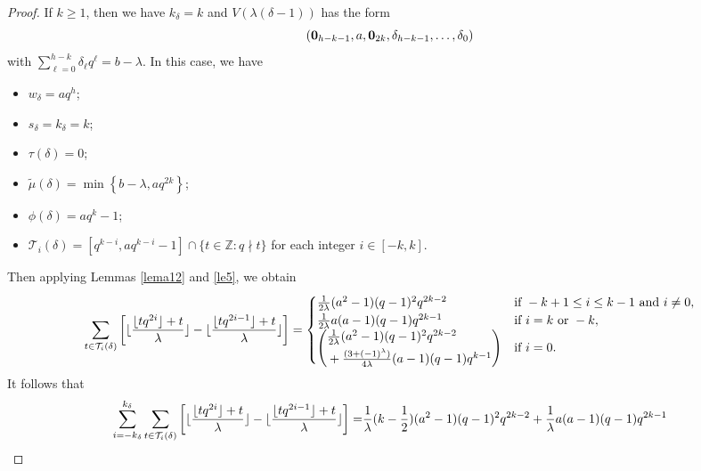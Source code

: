 \documentclass[journal,onecolumn]{IEEEtran}
\begin{document}
\begin{proof}
If $k\geq 1$, then we have  $k_{\delta}=k$ and $V(\lambda(\delta -1))$ has the form 
\begin{equation}\notag
    (\mathbf{0}_{h-k-1}, a, \mathbf{0}_{2k}, \delta_{h-k-1}, \ldots,\delta_0)
\end{equation}with $\sum\limits_{\ell=0}^{h-k}\delta_{\ell}q^{\ell}=b-\lambda$.
In this case, we have 
\begin{itemize}
\item $w_{\delta}=aq^h$;
    \item $s_{\delta}=k_{\delta}=k$;
    \item $\tau(\delta)=0$;
    \item $\widetilde{\mu}(\delta)=\min\left\{b-\lambda, a q^{2k}\right\}$;
    \item $\phi(\delta)=aq^k-1$;
   \item $\mathcal{T}_i(\delta)=\left[q^{k-i},a q^{k-i}-1\right]\cap \{t\in \mathbb{Z}: q\nmid t\}$ for each integer $i\in [-k,k]$.
\end{itemize}
Then applying Lemmas \ref{lema12} and \ref{le5}, we obtain 
\begin{equation}\notag
    \sum\limits_{t\in \mathcal{T}_i(\delta)} \left[ \lfloor\frac{\lfloor tq^{2i}\rfloor+t}{\lambda}\rfloor -  \lfloor\frac{\lfloor tq^{2i-1}\rfloor+t}{\lambda}\rfloor\right]= 
    \begin{cases}
         \frac{1}{2\lambda}(a^2-1)(q-1)^2q^{2k-2}  &\hbox{if } -k+1\leq i \leq  k-1 \hbox{ and } i\neq 0,\\
         \frac{1}{2\lambda}a(a-1)(q-1)q^{2k-1} &\hbox{if } i=k \hbox{ or } -k,\\
         {\left(\begin{aligned}
             &\textstyle{\frac{1}{2\lambda}(a^2-1)(q-1)^2q^{2k-2}}\\&+\textstyle{\frac{(3+(-1)^{\lambda})}{4\lambda}(a-1)(q-1)q^{k-1}}
         \end{aligned}\right)} & \hbox{if }i=0.
     \end{cases}      
\end{equation}
It follows that 
\begin{equation}\notag
\begin{split}
\sum\limits_{i=-k_{\delta}}^{k_{\delta}}\sum\limits_{t\in \mathcal{T}_i(\delta)}\left[ \lfloor\frac{\lfloor tq^{2i}\rfloor+t}{\lambda}\rfloor -  \lfloor\frac{\lfloor tq^{2i-1}\rfloor+t}{\lambda}\rfloor\right]=&
   \frac{1}{\lambda}(k-\frac{1}{2})(a^2-1)(q-1)^2q^{2k-2}+\frac{1}{\lambda}a(a-1)(q-1)q^{2k-1}\\

\end{split}
\end{equation}
\end{proof}
\end{document}
